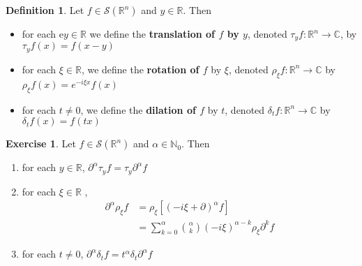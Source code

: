 \documentclass[12pt]{amsart}
\theoremstyle{definition}
\newtheorem{defn}[definition]{Definition}
\newtheorem{ex}[definition]{Exercise}
\newcommand{\p}{\partial}
\newcommand{\al}{\alpha}
\newcommand{\del}{\delta}
\newcommand{\C}{\mathbb{C}}
\newcommand{\N}{\mathbb{N}}
\newcommand{\R}{\mathbb{R}}
\newcommand{\MS}{\mathcal{S}}
\begin{document}
	
	\begin{defn}
		Let $f \in \MS(\R^n)$ and $y \in \R$. Then
		\begin{itemize}
			\item for each e$y \in \R$ we define the \textbf{translation of $f$ by $y$}, denoted $\tau_yf: \R^n \rightarrow \C$, by $\tau_yf(x) = f(x-y)$
			\item for each $\xi \in \R$, we define the \textbf{rotation of $f$} by $\xi$, denoted $\rho_{\xi} f: \R^n \rightarrow \C$ by $\rho_{\xi}f(x) = e^{-i\xi x}f(x)$
			\item for each $t \neq 0$, we define the \textbf{dilation of $f$} by $t$, denoted $\del_t f: \R^n \rightarrow \C$ by $\del_tf(x) = f(tx)$
		\end{itemize}
	\end{defn}

	\begin{ex}
		Let $f \in \MS(\R^n)$ and $\al \in \N_0$.  Then   
		\begin{enumerate}
			\item for each $y \in \R$, $\p^{\al}\tau_yf = \tau_y \p^{\al}f$ 
			\item for each $\xi \in \R$ ,
			\begin{align*}
				\p^{\al} \rho_{\xi} f 
				& =  \rho_{\xi} [(-i\xi + \p)^{\al}f] \\ 
				& =   \sum\limits_{k=0}^{\al} {\al \choose k} (-i\xi)^{\al-k}\rho_{\xi}\p^{k}f 
			\end{align*}
			\item for each $t \neq 0$, $\p^{\al} \del_tf = t^{\al} \del_t \p^{\al}f$
		\end{enumerate}
	\end{ex}
\end{document}
